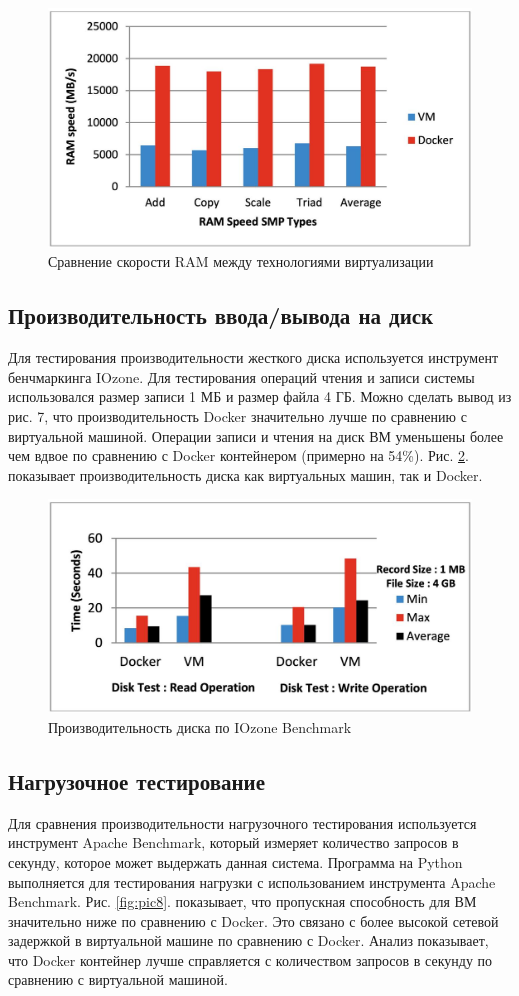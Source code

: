 \documentclass{mirea}
\begin{document}
	\begin{figure}[H]
		\centering
		\includegraphics[width=.6\textwidth]{img6}
		\parskip=6pt
		\caption{Сравнение скорости RAM между технологиями виртуализации}
		\label{fig:pic6}
	\end{figure}

	\subsection{Производительность ввода/вывода на диск}
	
	Для тестирования производительности жесткого диска используется инструмент бенчмаркинга IOzone. Для тестирования операций чтения и записи системы использовался размер записи 1 МБ и размер файла 4 ГБ. Можно сделать вывод из рис. 7, что производительность Docker значительно лучше по сравнению с виртуальной машиной. Операции записи и чтения на диск ВМ уменьшены более чем вдвое по сравнению с Docker контейнером (примерно на 54\%). Рис. \ref{fig:pic7}. показывает производительность диска как виртуальных машин, так и Docker.
	
	\begin{figure}[H]
		\centering
		\includegraphics[width=.6\textwidth]{img7}
		\parskip=6pt
		\caption{Производительность диска по IOzone Benchmark}
		\label{fig:pic7}
	\end{figure}

	\subsection{Нагрузочное тестирование}
	
	Для сравнения производительности нагрузочного тестирования используется инструмент Apache Benchmark, который измеряет количество запросов в секунду, которое может выдержать данная система. Программа на Python выполняется для тестирования нагрузки с использованием инструмента Apache Benchmark. Рис. \ref{fig:pic8}. показывает, что пропускная способность для ВМ значительно ниже по сравнению с Docker. Это связано с более высокой сетевой задержкой в виртуальной машине по сравнению с Docker. Анализ показывает, что Docker контейнер лучше справляется с количеством запросов в секунду по сравнению с виртуальной машиной.
	
\end{document}
